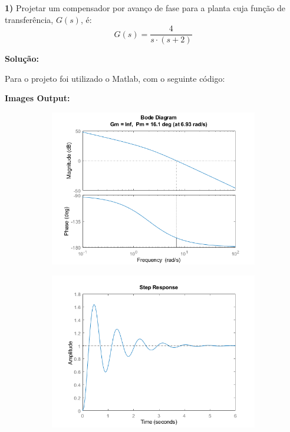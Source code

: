 \documentclass{layout}
\begin{document}
\printtitle

\noindent \textbf{1)} Projetar um compensador por avanço de fase para a planta cuja função de transferência, $G(s)$, é:
\[ G(s) = \dfrac{4}{s\cdot (s+2)}\]

\color{Red}
\noindent \textbf{Solução:}


\color{Black}
Para o projeto foi utilizado o Matlab, com o seguinte código:



\noindent \textbf{Images Output:}

\begin{figure}[H]
    \centering
    \begin{subfigure}[b]{0.49\textwidth}
        \centering
        \includegraphics[width=\textwidth]{images/figure1.png}
    \end{subfigure}
    \hfill
    \begin{subfigure}[b]{0.49\textwidth}
        \centering
        \includegraphics[width=\textwidth]{images/figure2.png}
    \end{subfigure}
\end{figure}
\end{document}

